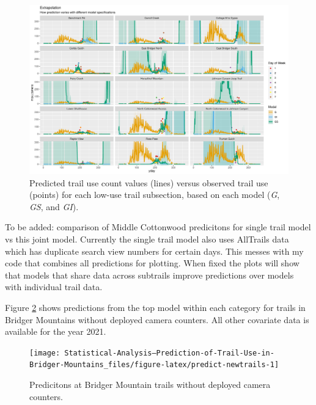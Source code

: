 \documentclass[
]{book}
\begin{document}
\begin{figure}

{\centering \includegraphics[width=1\linewidth]{../figures/low_pred_compare} 

}

\caption{Predicted trail use count values (lines) versus observed trail use (points) for each low-use trail subsection, based on each model (\emph{G}, \emph{GS}, and \emph{GI}).}\label{fig:low-pred-compare}
\end{figure}

To be added: comparison of Middle Cottonwood predicitons for single trail model vs this joint model. Currently the single trail model also uses AllTrails data which has duplicate search view numbers for certain days. This messes with my code that combines all predictions for plotting. When fixed the plots will show that models that share data across subtrails improve predictions over models with individual trail data.

Figure \ref{fig:predict-newtrails} shows predictions from the top model within each category for trails in Bridger Mountains without deployed camera counters. All other covariate data is available for the year 2021.

\begin{figure}

{\centering \texttt{[image: Statistical-Analysis--Prediction-of-Trail-Use-in-Bridger-Mountains\_files/figure-latex/predict-newtrails-1]} 

}

\caption{Predicitons at Bridger Mountain trails without deployed camera counters.}\label{fig:predict-newtrails}
\end{figure}
\end{document}
